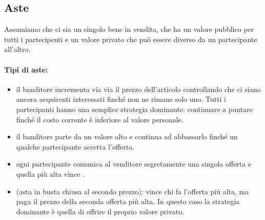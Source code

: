 
\subsection{Aste}

Assumiamo che ci sia un singolo bene in vendita, che ha un valore pubblico per tutti i partecipenti e un valore privato che può essere diverso da un partecipante all'altro. 

\paragraph{Tipi di aste:}

\begin{itemize}
  \item {} il banditore incrementa via via il prezzo dell'articolo controllando che ci siano ancora acquirenti interessati finché non ne rimane solo uno. Tutti i partecipanti hanno una semplice strategia dominante: continuare a puntare finché il costo corrente è inferiore al valore personale.
  \item {} il banditore parte da un valore alto e continua ad abbassarlo finché un qualche partecipante accetta l'offerta. 
  \item {} ogni partecipante comunica al venditore segretamente una singola offerta e quella più alta vince . 
  \item {} (asta in busta chiusa al secondo prezzo): vince chi fa l'offerta più alta, ma paga il prezzo della seconda offerta più alta. In questo caso la strategia dominante è quella di offrire il proprio valore privato.
\end{itemize}

